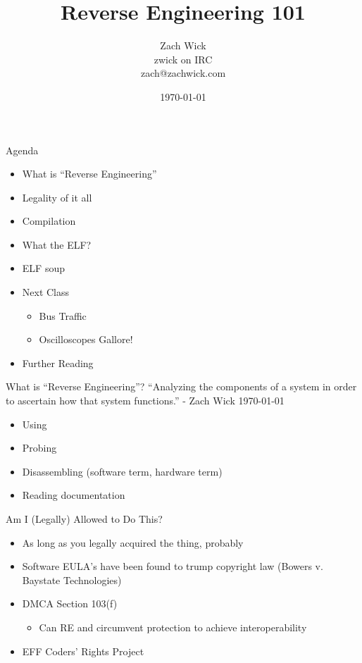 \documentclass[11pt]{beamer}
\author{Zach Wick \\ zwick on IRC \\ zach@zachwick.com}
\title{Reverse Engineering 101}
\institute{All Hands Active \\ http://allhandsactive.com}
\date{\today}
\begin{document}

\begin{frame}
  \titlepage
\end{frame}

\begin{frame}{Agenda}
  \begin{itemize}
    \item What is ``Reverse Engineering''
    \item Legality of it all
    \item Compilation
    \item What the ELF?
    \item ELF soup
    \item Next Class
      \begin{itemize}
        \item Bus Traffic
        \item Oscilloscopes Gallore!
      \end{itemize}
    \item Further Reading
  \end{itemize}
\end{frame}

\begin{frame}{What is ``Reverse Engineering''?}
  ``Analyzing the components of a system in order to ascertain how
  that system functions.'' - Zach Wick \today\\

  \begin{itemize}
    \item Using
    \item Probing
    \item Disassembling (software term, hardware term)
    \item Reading documentation
  \end{itemize}
\end{frame}

\begin{frame}{Am I (Legally) Allowed to Do This?}
  \begin{itemize}
    \item As long as you legally acquired the thing, probably
    \item Software EULA's have been found to trump copyright law
      (Bowers v. Baystate Technologies)
    \item DMCA Section 103(f)
      \begin{itemize}
        \item Can RE and circumvent protection to achieve interoperability
      \end{itemize}
    \item EFF Coders' Rights Project
  \end{itemize}
\end{frame}
\end{document}
